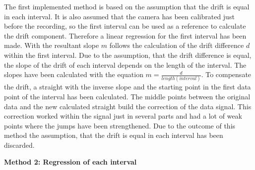 The first implemented method is based on the assumption that the drift is equal in each interval. It is also assumed that the camera has been calibrated just before the recording, so the first interval can be used as a reference to calculate the drift component. Therefore a linear regression for the first interval has been made. With the resultant slope $m$ follows the calculation of the drift difference $d$ within the first interval. Due to the assumption, that the drift difference is equal, the slope of the drift of each interval depends on the length of the interval. The slopes have been calculated with the equation $m=\frac{d}{length(interval)}$.
To compensate the drift, a straight with the inverse slope and the starting point in the first data point of the interval has been calculated. The middle points between the original data and the new calculated straight build the correction of the data signal.
This correction worked within the signal just in several parts and had a lot of weak points where the jumps have been strengthened. Due to the outcome of this method the assumption, that the drift is equal in each interval has been discarded. 


\textbf{Method 2: Regression of each interval}

